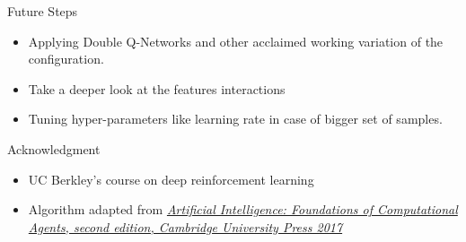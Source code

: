 \documentclass{beamer}
\begin{document}
	

    

\begin{frame}{Future Steps}
\begin{itemize}
    \item Applying Double Q-Networks and other acclaimed working variation of the configuration. 
    \item Take a deeper look at the features interactions
    \item Tuning hyper-parameters like learning rate in case of bigger set of samples.
\end{itemize}
\end{frame}


\begin{frame}{Acknowledgment}
\begin{itemize}
    \item UC Berkley’s course on deep reinforcement learning
    \item Algorithm adapted from \href{http://artint.info/html/ArtInt_265.html}{\textit{Artificial Intelligence: Foundations of Computational Agents, second edition, Cambridge University Press 2017}}
\end{itemize}
\end{frame}
\end{document}
